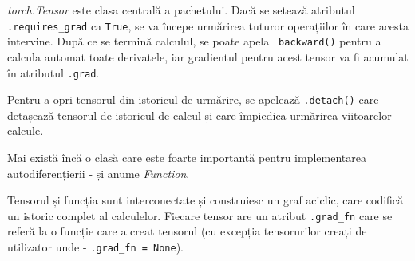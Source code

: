 \textit{torch.Tensor} este clasa centrală a pachetului. Dacă se setează atributul \texttt{.requires\_grad} ca  \texttt{True}, se va începe urmărirea tuturor operațiilor în care acesta intervine. După ce se termină calculul, se poate apela \texttt{ backward()} pentru a calcula automat toate derivatele, iar gradientul pentru acest tensor va fi acumulat în atributul \texttt{.grad}.

Pentru a opri tensorul din istoricul de urmărire, se apelează \texttt{.detach()} care detașează tensorul de istoricul de calcul și care împiedica urmărirea viitoarelor calcule.
 
Mai există încă o clasă care este foarte importantă pentru implementarea autodiferențierii - și anume \textit{Function}.

Tensorul și funcția sunt interconectate și construiesc un graf aciclic, care codifică un istoric complet al calculelor. Fiecare tensor are un atribut  \texttt{.grad\_fn} care se referă la o funcție care a creat tensorul (cu excepția tensorurilor creați de utilizator unde - \texttt{.grad\_fn = None}).